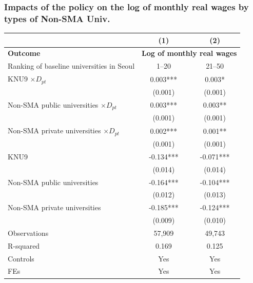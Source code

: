 \documentclass[aspectratio=169,xcolor=dvipsnames,handout]{beamer}
\begin{document}
\begin{frame}
    \frametitle{Impacts of the policy on the log of monthly real wages by types of Non-SMA Univ.}
    \begin{table}[ht]
        \tiny
        \centering
        \begin{tabular}{lcc}
        \toprule
        & \textbf{(1)} & \textbf{(2)} \\
        \midrule
        \textbf{Outcome} & \multicolumn{2}{c}{\textbf{Log of monthly real wages}} \\
        \midrule
        Ranking of baseline universities in Seoul    & 1--20     & 21--50    \\
        \midrule                                                             
        KNU9 $\times D_{pt}$                         & 0.003***  & 0.003*    \\
                                                     & (0.001)   & (0.001)   \\
        Non-SMA public universities $\times D_{pt}$  & 0.003***  & 0.003**   \\
                                                     & (0.001)   & (0.001)   \\
        Non-SMA private universities $\times D_{pt}$ & 0.002***  & 0.001**   \\
                                                     & (0.001)   & (0.001)   \\
        KNU9                                         & -0.134*** & -0.071*** \\
                                                     & (0.014)   & (0.014)   \\
        Non-SMA public universities                  & -0.164*** & -0.104*** \\
                                                     & (0.012)   & (0.013)   \\
        Non-SMA private universities                 & -0.185*** & -0.124*** \\
                                                     & (0.009)   & (0.010)   \\
        \midrule                                                             
        Observations                                 & 57,909    & 49,743    \\
        R-squared                                    & 0.169     & 0.125     \\
        Controls                                     & Yes       & Yes       \\
        FEs                                          & Yes       & Yes       \\
        \bottomrule
        \end{tabular}
    \end{table}
\end{frame}
\end{document}

